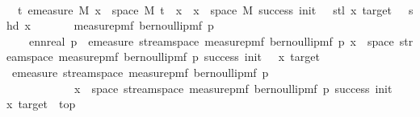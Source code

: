 \begin{isabellebody}
\ \isamarkupfalse%
\ {\isachardoublequoteopen}{\isasymintegral}\isactrlsup {\isacharplus}{\kern0pt}\ t{\isachardot}{\kern0pt}\ emeasure\ M\ {\isacharbraceleft}{\kern0pt}x\ {\isasymin}\ space\ M{\isachardot}{\kern0pt}\ t\ {\isacharhash}{\kern0pt}{\isacharhash}{\kern0pt}\ x\ {\isasymin}\ {\isacharbraceleft}{\kern0pt}x\ {\isasymin}\ space\ M{\isachardot}{\kern0pt}\ success\ {\isacharparenleft}{\kern0pt}init\ {\isacharminus}{\kern0pt}\ {}{\isacharparenright}{\kern0pt}\ {\isacharparenleft}{\kern0pt}stl\ x{\isacharparenright}{\kern0pt}\ target\ {\isasymand}\ {\isasymnot}\ shd\ x{\isacharbraceright}{\kern0pt}{\isacharbraceright}{\kern0pt}\isanewline
\ \ \ \ \ \ \ {\isasympartial}measure{\isacharunderscore}{\kern0pt}pmf\ {\isacharparenleft}{\kern0pt}bernoulli{\isacharunderscore}{\kern0pt}pmf\ p{\isacharparenright}{\kern0pt}\ {\isacharequal}{\kern0pt}\isanewline
\ \ \ \ ennreal\ {\isacharparenleft}{\kern0pt}{}{\isacharminus}{\kern0pt}p{\isacharparenright}{\kern0pt}\ {\isacharasterisk}{\kern0pt}\ emeasure\ {\isacharparenleft}{\kern0pt}stream{\isacharunderscore}{\kern0pt}space\ {\isacharparenleft}{\kern0pt}measure{\isacharunderscore}{\kern0pt}pmf\ {\isacharparenleft}{\kern0pt}bernoulli{\isacharunderscore}{\kern0pt}pmf\ p{\isacharparenright}{\kern0pt}{\isacharparenright}{\kern0pt}{\isacharparenright}{\kern0pt}\ {\isacharbraceleft}{\kern0pt}x\ {\isasymin}\ space\ {\isacharparenleft}{\kern0pt}stream{\isacharunderscore}{\kern0pt}space\ {\isacharparenleft}{\kern0pt}measure{\isacharunderscore}{\kern0pt}pmf\ {\isacharparenleft}{\kern0pt}bernoulli{\isacharunderscore}{\kern0pt}pmf\ p{\isacharparenright}{\kern0pt}{\isacharparenright}{\kern0pt}{\isacharparenright}{\kern0pt}{\isachardot}{\kern0pt}\ success\ {\isacharparenleft}{\kern0pt}init\ {\isacharminus}{\kern0pt}\ {}{\isacharparenright}{\kern0pt}\ x\ target{\isacharbraceright}{\kern0pt}{\isachardoublequoteclose}\isanewline
\ \ \ \ \isamarkupfalse%
{\isacharminus}{\kern0pt}\isanewline
\ \ \ \ \ \ \isamarkupfalse%
\ {\isachardoublequoteopen}emeasure\ {\isacharparenleft}{\kern0pt}stream{\isacharunderscore}{\kern0pt}space\ {\isacharparenleft}{\kern0pt}measure{\isacharunderscore}{\kern0pt}pmf\ {\isacharparenleft}{\kern0pt}bernoulli{\isacharunderscore}{\kern0pt}pmf\ p{\isacharparenright}{\kern0pt}{\isacharparenright}{\kern0pt}{\isacharparenright}{\kern0pt}\isanewline
\ \ \ \ \ \ \ \ \ \ \ \ {\isacharbraceleft}{\kern0pt}x\ {\isasymin}\ space\ {\isacharparenleft}{\kern0pt}stream{\isacharunderscore}{\kern0pt}space\ {\isacharparenleft}{\kern0pt}measure{\isacharunderscore}{\kern0pt}pmf\ {\isacharparenleft}{\kern0pt}bernoulli{\isacharunderscore}{\kern0pt}pmf\ p{\isacharparenright}{\kern0pt}{\isacharparenright}{\kern0pt}{\isacharparenright}{\kern0pt}{\isachardot}{\kern0pt}\ success\ {\isacharparenleft}{\kern0pt}init\ {\isacharminus}{\kern0pt}\ {}{\isacharparenright}{\kern0pt}\ x\ target{\isacharbraceright}{\kern0pt}\ {\isasymnoteq}\ top{\isachardoublequoteclose}\isanewline

\end{isabellebody}
